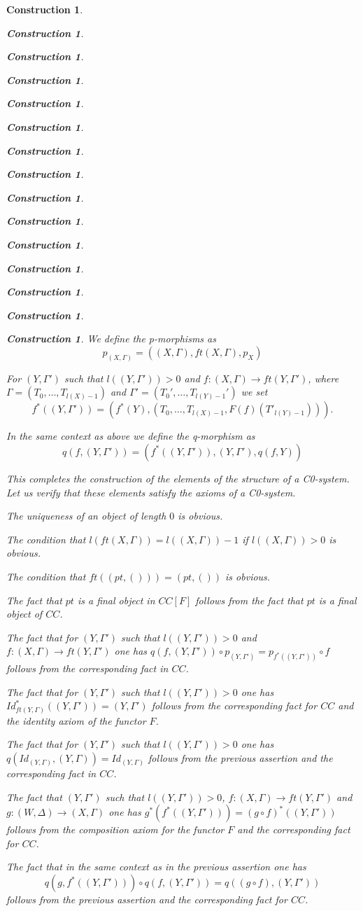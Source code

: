 \documentclass[onecolumn,12pt]{amsart}
\numberwithin{proposition}{subsection}
\newtheorem{construction}[proposition]{Construction}
\newcommand{\sr}{\rightarrow}
\begin{document}
\begin{construction}
\begin{construction}
\begin{construction}
\begin{construction}
\begin{construction}
\begin{construction}
\begin{construction}
\begin{construction}
\begin{construction}
\begin{construction}
\begin{construction}
\begin{construction}
\begin{construction}
\begin{construction}
\begin{construction}
We define the p-morphisms as 
%
$$p_{(X,\Gamma)}=((X,\Gamma),ft(X,\Gamma), p_X)$$

For $(Y,\Gamma')$ such that $l((Y,\Gamma'))>0$ and $f:(X,\Gamma)\sr ft(Y,\Gamma')$, where $\Gamma=(T_0,\dots,T_{l(X)-1})$ and $\Gamma'=(T_0',\dots,T_{l(Y)-1}')$ we set
%
\begin{equation}\label{2016.01.31.eq1}
f^*((Y,\Gamma'))=(f^*(Y),(T_0,\dots,T_{l(X)-1},F(f)(T'_{l(Y)-1}))).
\end{equation}%
%

In the same context as above we define the q-morphism as
%
$$q(f,(Y,\Gamma'))=(f^*((Y,\Gamma')),(Y,\Gamma'),q(f,Y))$$

This completes the construction of the elements of the structure of a C0-system. Let us verify that these elements satisfy the axioms of a C0-system. 

The uniqueness of an object of length $0$ is obvious.

The condition that $l(ft(X,\Gamma))=l((X,\Gamma))-1$ if $l((X,\Gamma))>0$ is obvious.

The condition that $ft((pt,()))=(pt,())$ is obvious. 

The fact that $pt$ is a final object in $CC[F]$ follows from the fact that $pt$ is a final object of $CC$.

The fact that for $(Y,\Gamma')$ such that $l((Y,\Gamma'))>0$ and
$f:(X,\Gamma)\sr ft(Y,\Gamma')$ one has $q(f,(Y,\Gamma'))\circ
p_{(Y,\Gamma')}=p_{f^*((Y,\Gamma'))}\circ f$ follows from the corresponding
fact in $CC$.

The fact that for $(Y,\Gamma')$ such that $l((Y,\Gamma'))>0$ one has
$Id_{ft(Y,\Gamma)}^*((Y,\Gamma'))=(Y,\Gamma')$ follows from the corresponding
fact for $CC$ and the identity axiom of the functor $F$.

The fact that for $(Y,\Gamma')$ such that $l((Y,\Gamma'))>0$ one has
$q(Id_{(Y,\Gamma)},(Y,\Gamma))=Id_{(Y,\Gamma)}$ follows from the previous
assertion and the corresponding fact in $CC$.

The fact that $(Y,\Gamma')$ such that $l((Y,\Gamma'))>0$, $f:(X,\Gamma)\sr
ft(Y,\Gamma')$ and $g:(W,\Delta)\sr (X,\Gamma)$ one has
$g^*(f^*((Y,\Gamma')))=(g\circ f)^*((Y,\Gamma'))$ follows from the composition
axiom for the functor $F$ and the corresponding fact for $CC$.

The fact that in the same context as in the previous assertion one has
%
$$q(g,f^*((Y,\Gamma')))\circ q(f,(Y,\Gamma'))=q((g\circ f),(Y,\Gamma'))$$
%
follows from the previous assertion and the corresponding fact for $CC$. 


\end{construction}
\end{construction}
\end{construction}
\end{construction}
\end{construction}
\end{construction}
\end{construction}
\end{construction}
\end{construction}
\end{construction}
\end{construction}
\end{construction}
\end{construction}
\end{construction}
\end{construction}
\end{document}

